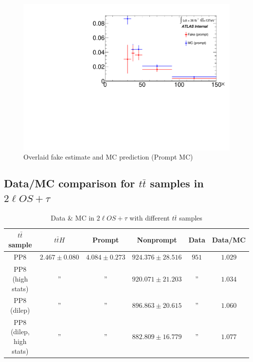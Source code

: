 \documentclass[11pt]{article}
\begin{document}
	\begin{figure}[H]
		\centering
		\includegraphics[width=0.7\linewidth]{figures/FakesEstimate_data_pp8_nonallhad_new_scaledHists/Overlay_FF_tau_pt_prompt.pdf}
		\caption{Overlaid fake estimate and MC prediction (Prompt MC)}
	\end{figure}	




	\clearpage
	\subsection{Data/MC comparison for $t\bar{t}$ samples in $2\ell OS+\tau$} 

	\begin{table}[htp]
	\caption{Data \& MC in $2\ell OS+\tau$ with different $t\bar{t}$ samples}
	\begin{center}
	\begin{tabular}{|c|c|c|c|c|c|}
	\hline
	$t\bar{t}$ sample 	& $t\bar{t}H$	& Prompt		& Nonprompt		& 	 Data 	& Data/MC\\
	\hline
	PP8 				& 	$2.467 \pm 0.080$ 		& $4.084 \pm 0.273$ 		& $924.376 \pm 28.516$	&  $951$ 	& $1.029$\\
	PP8 (high stats)		& 			''	 		&			''			& $920.071 \pm 21.203$	&  	''	& $1.034$\\
	PP8 (dilep) 			& 			''	 		& 			''			& $896.863 \pm 20.615$	&   	''	& $1.060$\\
	PP8 (dilep, high stats)	& 			''			& 			''	 		& $882.809 \pm 16.779$	&   	''	& $1.077$\\ 
	\hline
	\end{tabular}
	\end{center}
	\label{default}
	\end{table}%
\end{document}
